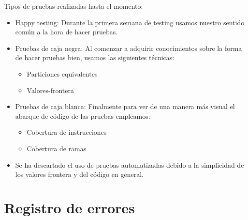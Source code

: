 \documentclass[DIV=calc,paper=a4,fontsize=11pt,onecolumn]{scrartcl}	 %
\begin{document}
{Tipos de pruebas realizadas hasta el momento:}
\begin{itemize}
	\item{Happy testing: Durante la primera semana de testing usamos nuestro sentido común a la hora de hacer pruebas.}
	\item{Pruebas de caja negra: Al comenzar a adquirir conocimientos sobre la forma de hacer pruebas bien, usamos las siguientes técnicas:}
	\begin{itemize}
		\item{Particiones equivalentes}
		\item{Valores-frontera}
	\end{itemize}
	\item{Pruebas de caja blanca: Finalmente para ver de una manera más visual el abarque de código de las pruebas empleamos: }
	\begin{itemize}
		\item{Cobertura de instrucciones}
		\item{Cobertura de ramas}	
	\end{itemize}
    \item{Se ha descartado el uso de pruebas automatizadas debido a la simplicidad de los valores frontera y del código en general.}
\end{itemize}

\clearpage

\section{Registro de errores}
\end{document}
